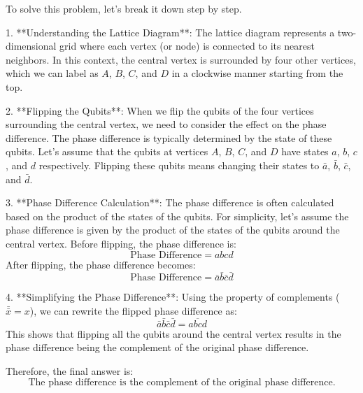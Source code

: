 To solve this problem, let's break it down step by step.

1. **Understanding the Lattice Diagram**: The lattice diagram represents a two-dimensional grid where each vertex (or node) is connected to its nearest neighbors. In this context, the central vertex is surrounded by four other vertices, which we can label as \(A\), \(B\), \(C\), and \(D\) in a clockwise manner starting from the top.

2. **Flipping the Qubits**: When we flip the qubits of the four vertices surrounding the central vertex, we need to consider the effect on the phase difference. The phase difference is typically determined by the state of these qubits. Let's assume that the qubits at vertices \(A\), \(B\), \(C\), and \(D\) have states \(a\), \(b\), \(c\), and \(d\) respectively. Flipping these qubits means changing their states to \(\bar{a}\), \(\bar{b}\), \(\bar{c}\), and \(\bar{d}\).

3. **Phase Difference Calculation**: The phase difference is often calculated based on the product of the states of the qubits. For simplicity, let's assume the phase difference is given by the product of the states of the qubits around the central vertex. Before flipping, the phase difference is:
   \[
   \text{Phase Difference} = abc d
   \]
   After flipping, the phase difference becomes:
   \[
   \text{Phase Difference} = \bar{a} \bar{b} \bar{c} \bar{d}
   \]

4. **Simplifying the Phase Difference**: Using the property of complements (\(\bar{\bar{x}} = x\)), we can rewrite the flipped phase difference as:
   \[
   \bar{a} \bar{b} \bar{c} \bar{d} = \overline{abcd}
   \]
   This shows that flipping all the qubits around the central vertex results in the phase difference being the complement of the original phase difference.

Therefore, the final answer is:
\[
\boxed{\text{The phase difference is the complement of the original phase difference.}}
\]